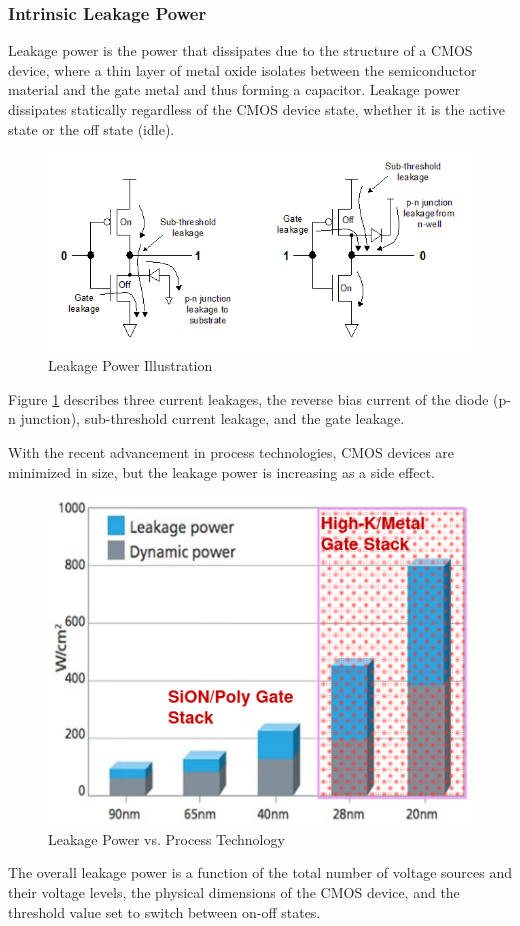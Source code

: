 \subsubsection{Intrinsic Leakage Power}
Leakage power is the power that dissipates due to the 
structure of a CMOS device, 
where a thin layer of metal oxide isolates
between the semiconductor material and the
gate metal and thus forming a capacitor. 
Leakage power dissipates statically regardless of the CMOS 
device state, 
whether it is the active state or the off state (idle).

\begin{figure}[H]
    \centering
    \includegraphics[width=0.75\linewidth]{Features/images/leak_power_schem}
    \caption{Leakage Power Illustration}\label{fig:leak_power_schem}
\end{figure}

Figure \ref{fig:leak_power_schem} describes three current leakages,
the reverse bias current of the diode (p-n junction), sub-threshold current leakage, and
the gate leakage.

With the recent advancement in process technologies, 
CMOS devices are minimized in size, 
but the leakage power is increasing as a side effect.
\begin{figure}[H]
    \centering
    \includegraphics[width=0.55\linewidth]{Features/images/leak_vs_nm}
    \caption{Leakage Power vs. Process Technology}\label{fig:leak_vs_nm}
\end{figure}
The overall leakage power is a function 
of the total number of voltage sources and their voltage levels, 
the physical dimensions of the CMOS device, 
and the threshold value set to switch between on-off states.

